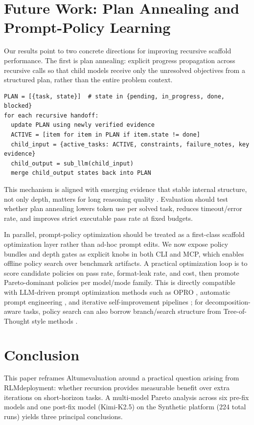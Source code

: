 \documentclass[11pt]{article}
\newcommand{\altum}{Altum}
\newcommand{\rlm}{RLM}
\begin{document}
\section{Future Work: Plan Annealing and Prompt-Policy Learning}
Our results point to two concrete directions for improving recursive scaffold performance. The first is plan annealing: explicit progress propagation across recursive calls so that child models receive only the unresolved objectives from a structured plan, rather than the entire problem context.

\begin{lstlisting}[language={}]
PLAN = [{task, state}]  # state in {pending, in_progress, done, blocked}
for each recursive handoff:
  update PLAN using newly verified evidence
  ACTIVE = [item for item in PLAN if item.state != done]
  child_input = {active_tasks: ACTIVE, constraints, failure_notes, key evidence}
  child_output = sub_llm(child_input)
  merge child_output states back into PLAN
\end{lstlisting}

This mechanism is aligned with emerging evidence that stable internal structure, not only depth, matters for long reasoning quality \cite{chen2026molecular}. Evaluation should test whether plan annealing lowers token use per solved task, reduces timeout/error rate, and improves strict executable pass rate at fixed budgets.

In parallel, prompt-policy optimization should be treated as a first-class scaffold optimization layer rather than ad-hoc prompt edits. We now expose policy bundles and depth gates as explicit knobs in both CLI and MCP, which enables offline policy search over benchmark artifacts. A practical optimization loop is to score candidate policies on pass rate, format-leak rate, and cost, then promote Pareto-dominant policies per model/mode family. This is directly compatible with LLM-driven prompt optimization methods such as OPRO \cite{zhou2023opro}, automatic prompt engineering \cite{zhou2023ape}, and iterative self-improvement pipelines \cite{zelikman2022star}; for decomposition-aware tasks, policy search can also borrow branch/search structure from Tree-of-Thought style methods \cite{yao2023tot}.

\section{Conclusion}
This paper reframes \altum evaluation around a practical question arising from \rlm deployment: whether recursion provides measurable benefit over extra iterations on short-horizon tasks. A multi-model Pareto analysis across six pre-fix models and one post-fix model (Kimi-K2.5) on the Synthetic platform (224 total runs) yields three principal conclusions.
\end{document}
